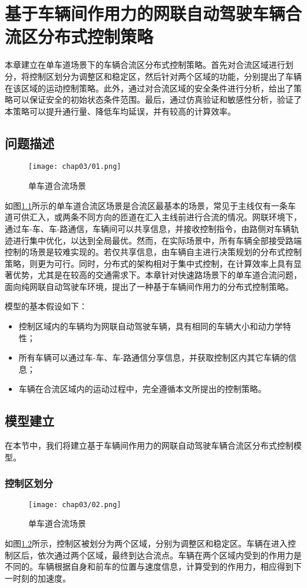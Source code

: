\chapter{基于车辆间作用力的网联自动驾驶车辆合流区分布式控制策略}
\label{chap:3}

本章建立在单车道场景下的车辆合流区分布式控制策略。首先对合流区域进行划分，将控制区划分为调整区和稳定区，然后针对两个区域的功能，分别提出了车辆在该区域的运动控制策略。此外，通过对合流区域的安全条件进行分析，给出了策略可以保证安全的初始状态条件范围。最后，通过仿真验证和敏感性分析，验证了本策略可以提升通行量、降低车均延误，并有较高的计算效率。

\section{问题描述}
\begin{figure}[htbp]
    \centering
    \texttt{[image: chap03/01.png]}
    \caption{单车道合流场景}
    \label{fig:scenario}
\end{figure}
如图\ref{fig:scenario}所示的单车道合流区场景是合流区最基本的场景，常见于主线仅有一条车道可供汇入，或两条不同方向的匝道在汇入主线前进行合流的情况。网联环境下，通过车-车、车-路通信，车辆间可以共享信息，并接收控制指令，由路侧对车辆轨迹进行集中优化，以达到全局最优。然而，在实际场景中，所有车辆全部接受路端控制的场景是较难实现的。若仅共享信息，由车辆自主进行决策规划的分布式控制策略，则更为可行。同时，分布式的架构相对于集中式控制，在计算效率上具有显著优势，尤其是在较高的交通需求下。本章针对快速路场景下的单车道合流问题，面向纯网联自动驾驶车环境，提出了一种基于车辆间作用力的分布式控制策略。

模型的基本假设如下：
\begin{itemize}
    \item 控制区域内的车辆均为网联自动驾驶车辆，具有相同的车辆大小和动力学特性；
    \item 所有车辆可以通过车-车、车-路通信分享信息，并获取控制区内其它车辆的信息；
    \item 车辆在合流区域内的运动过程中，完全遵循本文所提出的控制策略。
\end{itemize}



\section{模型建立}
在本节中，我们将建立基于车辆间作用力的网联自动驾驶车辆合流区分布式控制模型。

\subsection{控制区划分}
\begin{figure}[htbp]
    \centering
    \texttt{[image: chap03/02.png]}
    \caption{单车道合流场景}
    \label{fig:scenario_single_lane}
\end{figure}
如图\ref{fig:scenario_single_lane}所示，控制区被划分为两个区域，分别为调整区和稳定区。车辆在进入控制区后，依次通过两个区域，最终到达合流点。车辆在两个区域内受到的作用力是不同的。车辆根据自身和前车的位置与速度信息，计算受到的作用力，相应得到下一时刻的加速度。

